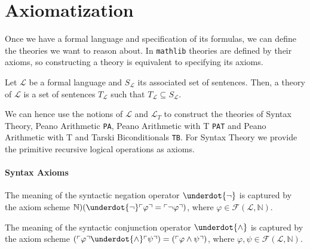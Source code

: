 \chapter{Axiomatization}\label{chapter:axiomatization}
Once we have a formal language and specification of its formulas, we can define the theories we want to reason about. In \texttt{mathlib} theories are defined by their axioms, so constructing a theory is equivalent to specifying its axioms. 

\begin{definition}[Theory]\label{def:FO-Theory}
  \leanok
  Let $\mathcal{L}$ be a formal language and $S_{\mathcal{L}}$ its associated set of sentences. Then, a theory of $\mathcal{L}$ is a set of sentences $T_{\mathcal{L}}$ such that $T_{\mathcal{L}} \subseteq S_{\mathcal{L}}$.
\end{definition}

We can hence use the notions of $\mathcal{L}$ and $\mathcal{L}_T$ to construct the theories of Syntax Theory, Peano Arithmetic \texttt{PA}, Peano Arithmetic with T \texttt{PAT} and Peano Arithmetic with T and Tarski Biconditionals \texttt{TB}. For Syntax Theory we provide the primitive recursive logical operations as axioms.
\subsubsection{Syntax Axioms}
\begin{definition}\label{def:Syntactic-Neg}
  \leanok
  The meaning of the syntactic negation operator $\underdot{\neg}$ is captured by the axiom scheme $\mathbb{N})(\underdot{\neg} \ulcorner \varphi \urcorner = \ulcorner \neg \varphi \urcorner)$, where $\varphi \in \mathcal{F}(\mathcal{L},\mathbb{N})$. 
\end{definition}

\begin{definition}\label{def:Syntactic-Conj}
  \leanok
  The meaning of the syntactic conjunction operator $\underdot{\wedge}$ is captured by the axiom scheme $(\ulcorner \varphi \urcorner \underdot{\wedge} \ulcorner \psi \urcorner) = (\ulcorner \varphi \wedge \psi \urcorner)$, where $\varphi, \psi \in \mathcal{F}(\mathcal{L},\mathbb{N})$.
\end{definition}

